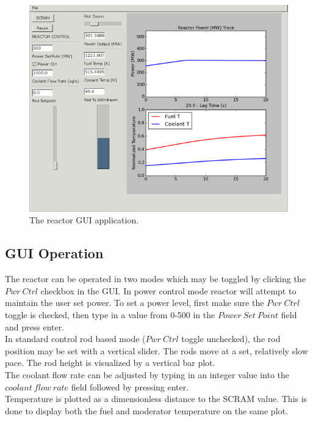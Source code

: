 \documentclass[8pt]{article}
\begin{document}
\begin{figure}
\centering
\includegraphics[scale=0.4]{../simulator_screenshot.png}
\caption{The reactor GUI application.}
\end{figure}

\subsection{GUI Operation}

The reactor can be operated in two modes which may be toggled by clicking the $Pwr\ Ctrl$ checkbox in the GUI. In power control mode reactor will attempt to maintain the user set power.  To set a power level, first make sure the $Pwr\ Ctrl$ toggle is checked, then type in a value from 0-500 in the $Power\ Set\ Point$ field and press enter.  \\

In standard control rod based mode ($Pwr\ Ctrl$ toggle unchecked), the rod position may be set with a vertical slider. The rods move at a set, relatively slow pace. The rod height is visualized by a vertical bar plot. \\

The coolant flow rate can be adjusted by typing in an integer value into the $coolant\ flow\ rate$ field followed by pressing enter. \\

Temperature is plotted as a dimensionless distance to the SCRAM value. This is done to display both the fuel and moderator temperature on the same plot. \\
\end{document}
